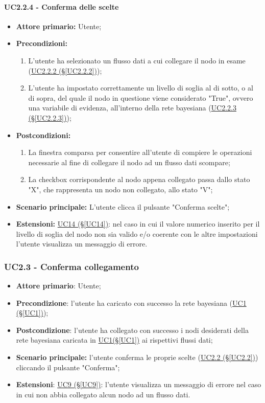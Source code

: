 \paragraph{UC2.2.4 - Conferma delle scelte}\label{UC2.2.4}
\begin{itemize}
\item \textbf{Attore primario:} Utente;
\item \textbf{Precondizioni:}
	\begin{enumerate}
	\item L'utente ha selezionato un flusso dati a cui collegare il nodo in esame (\hyperref[UC2.2.2]{UC2.2.2 							(§\ref*{UC2.2.2})});
	\item L'utente ha impostato correttamente un livello di soglia al di sotto, o al di sopra, 	del quale il nodo in 			questione viene considerato "True", ovvero una variabile di evidenza, all'interno della rete 	bayesiana 							(\hyperref[UC2.2.3]{UC2.2.3 (§\ref*{UC2.2.3})});
	\end{enumerate}
\item \textbf{Postcondizioni:}
	\begin{enumerate}
	\item La finestra comparsa per consentire all'utente di compiere le operazioni necessarie al fine di collegare il 		nodo ad un flusso dati scompare;
	\item La checkbox corrispondente al nodo appena collegato passa dallo stato "X", che rappresenta un nodo non 					collegato, allo stato "V";
	\end{enumerate}
\item \textbf{Scenario principale:} L'utente clicca il pulsante "Conferma scelte";
\item \textbf{Estensioni:} \hyperref[UC14]{UC14 (§\ref*{UC14})}: nel caso in cui il valore numerico inserito per il livello di soglia del nodo non sia valido e/o coerente con le altre impostazioni l'utente visualizza un messaggio di errore.
\end{itemize}

\pagebreak

\subsubsection{UC2.3 - Conferma collegamento}\label{UC2.3}
\begin{itemize}
\item \textbf{Attore primario}: Utente;
\item \textbf{Precondizione}: l'utente ha caricato con successo la rete bayesiana (\hyperref[UC1]{UC1 (§\ref*{UC1})});
\item \textbf{Postcondizione}: l'utente ha collegato con successo i nodi desiderati della rete bayesiana caricata 			in \hyperref[UC1]{UC1(§\ref*{UC1})} ai rispettivi flussi dati;
\item \textbf{Scenario principale:} l'utente conferma le proprie scelte (\hyperref[UC2.2]{UC2.2 (§\ref*{UC2.2})}) cliccando il pulsante "Conferma";
\item \textbf{Estensioni}: \hyperref[UC9]{UC9 (§\ref*{UC9})}: l'utente visualizza un messaggio di errore nel caso in cui non abbia collegato alcun nodo ad un flusso dati.
\end{itemize}
\newpage

